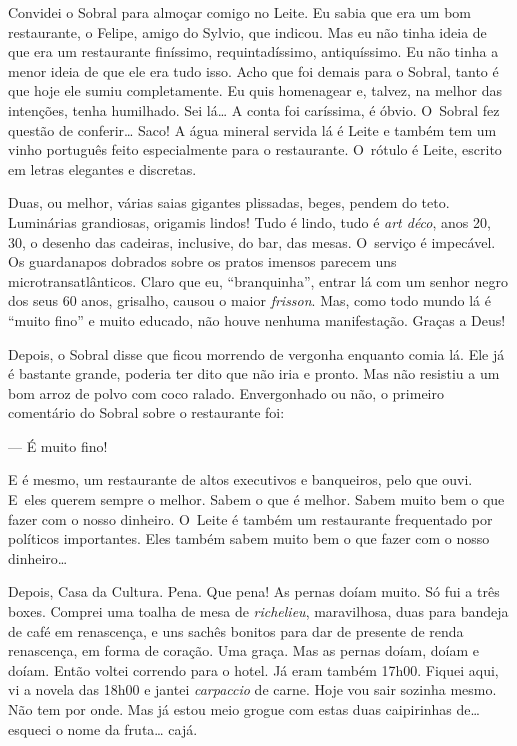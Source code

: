 Convidei o Sobral para almoçar comigo no Leite. Eu sabia que era um bom
restaurante, o Felipe, amigo do Sylvio, que indicou. Mas eu não tinha
ideia de que era um restaurante finíssimo, requintadíssimo,
antiquíssimo. Eu não tinha a menor ideia de que ele era tudo isso. Acho
que foi demais para o Sobral, tanto é que hoje ele sumiu completamente.
Eu quis homenagear e, talvez, na melhor das intenções, tenha humilhado.
Sei lá… A conta foi caríssima, é óbvio. O~Sobral fez questão de
conferir… Saco! A água mineral servida lá é Leite e também tem um
vinho português feito especialmente para o restaurante. O~rótulo é
Leite, escrito em letras elegantes e discretas.

Duas, ou melhor, várias saias gigantes plissadas, beges, pendem do teto.
Luminárias grandiosas, origamis lindos! Tudo é lindo, tudo é \emph{art
déco}, anos 20, 30, o desenho das cadeiras, inclusive, do bar, das mesas.
O~serviço é impecável. Os guardanapos dobrados sobre os pratos imensos
parecem uns microtransatlânticos. Claro que eu, ``branquinha'', entrar
lá com um senhor negro dos seus 60 anos, grisalho, causou o maior
\emph{frisson}. Mas, como todo mundo lá é ``muito fino'' e muito
educado, não houve nenhuma manifestação. Graças a Deus!

Depois, o Sobral disse que ficou morrendo de vergonha enquanto comia lá.
Ele já é bastante grande, poderia ter dito que não iria e pronto. Mas
não resistiu a um bom arroz de polvo com coco ralado. Envergonhado ou
não, o primeiro comentário do Sobral sobre o restaurante foi:

--- É muito fino!

E é mesmo, um restaurante de altos executivos e banqueiros, pelo que
ouvi. E~eles querem sempre o melhor. Sabem o que é melhor. Sabem muito
bem o que fazer com o nosso dinheiro. O~Leite é também um restaurante
frequentado por políticos importantes. Eles também sabem muito bem o que
fazer com o nosso dinheiro…

Depois, Casa da Cultura. Pena. Que pena! As pernas doíam muito.
Só fui a três boxes. Comprei uma toalha de mesa de \emph{richelieu},
maravilhosa, duas para bandeja de café em renascença, e uns sachês
bonitos para dar de presente de renda renascença, em forma de coração.
Uma graça. Mas as pernas doíam, doíam e doíam. Então voltei correndo
para o hotel. Já eram também 17h00. Fiquei aqui, vi a novela das 18h00 e
jantei \emph{carpaccio} de carne. Hoje vou sair sozinha mesmo. Não tem
por onde. Mas já estou meio grogue com estas duas caipirinhas de…
esqueci o nome da fruta… cajá.

